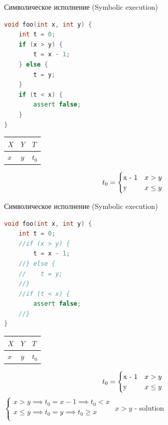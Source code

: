 \documentclass{beamer}
\begin{document}
\begin{frame}[fragile]{Символическое исполнение (Symbolic execution)}
\begin{minipage}{0.49\textwidth}
\begin{lstlisting}[language=C++]
void foo(int x, int y) {
    int t = 0;
    if (x > y) {
        t = x - 1;
    } else {
        t = y;
    }
    if (t < x) {
        assert false;
    }
}
\end{lstlisting}
\end{minipage}
\hfill
\begin{minipage}{0.49\textwidth}
\begin{center}
\begin{tabular}{ | l | l | l | }
\hline
$X$ & $Y$ & $T$ \\
\hline
$x$ & $y$ & $t_0$ \\
\hline
\end{tabular}
\begin{equation*}
t_0 =
    \begin{cases}
    $x - 1$ &\text{$x > y$}\\
    $y$ &\text{$x \le y$}
    \end{cases}
\end{equation*}
\end{center}
\end{minipage}
\end{frame}

\begin{frame}[fragile]{Символическое исполнение (Symbolic execution)}
\begin{minipage}{0.49\textwidth}
\begin{lstlisting}[language=C++]
void foo(int x, int y) {
    int t = 0;
    //if (x > y) {
        t = x - 1;
    //} else {
    //    t = y;
    //}
    //if (t < x) {
        assert false;
    //}
}
\end{lstlisting}
\end{minipage}
\hfill
\begin{minipage}{0.49\textwidth}
\begin{center}
\begin{tabular}{ | l | l | l | }
\hline
$X$ & $Y$ & $T$ \\
\hline
$x$ & $y$ & $t_0$ \\
\hline
\end{tabular}
\begin{equation*}
t_0 =
    \begin{cases}
    $x - 1$ &\text{$x > y$}\\
    $y$ &\text{$x \le y$}
    \end{cases}
\end{equation*}
$\left\{
\begin{array}{l}
x > y \implies t_0 = x - 1 \implies t_0 < x \\
x \le y \implies t_0 = y \implies t_0 \ge x \\
\end{array}
\right.$
$x > y$ - solution
\end{center}
\end{minipage}
\end{frame}
\end{document}
